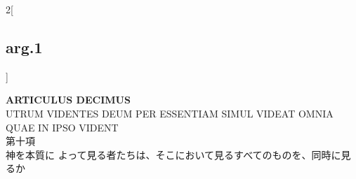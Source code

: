 \documentclass[paper=a4paper,fontsize=10pt,jafontsize=9pt,titlepage]{jlreq}
\begin{document}
\begin{paracol}{2}[\subsection{arg.1}]
\end{paracol}

\newpage

\begin{center}
{\Large {\bfseries ARTICULUS DECIMUS}}\\ {\large UTRUM VIDENTES DEUM PER
ESSENTIAM SIMUL VIDEAT OMNIA\\QUAE IN IPSO VIDENT\\第十項\\神を本質に
よって見る者たちは、そこにおいて見るすべてのものを、同時に見るか}
\end{center}

{}
\setcounter{section}{10}
\setcounter{subsection}{0}
\end{document}
